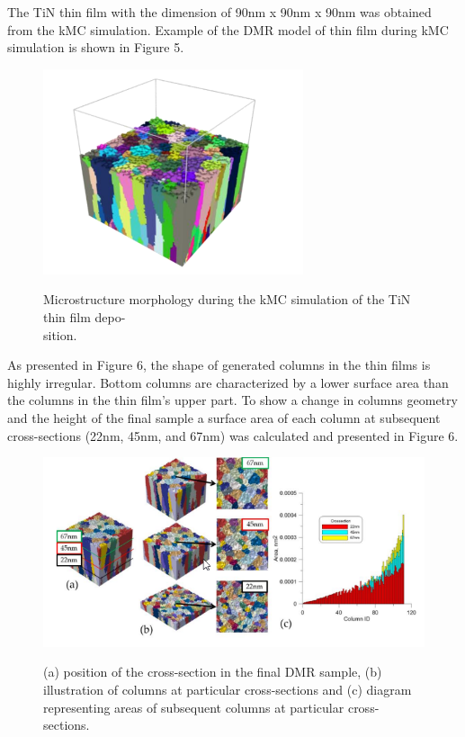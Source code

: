 \documentclass[journal,article,submit,pdftex,moreauthors]{Definitions/mdpi}
\begin{document}
The TiN thin film with the dimension of 90nm x 90nm x 90nm was obtained from the kMC simulation. Example of the DMR model of thin film during kMC simulation is shown in Figure 5.
 
\begin{figure}[H]
  \captionsetup{justification=centering}
  \centering
  \includegraphics{Definitions/picture5.png}
  \label{fig:obraz5}
    \caption{Microstructure morphology during the kMC simulation of the TiN thin film depo-\\sition.}
\end{figure}   
 
 
As presented in Figure 6, the shape of generated columns in the thin films is highly irregular. Bottom columns are characterized by a lower surface area than the columns in the thin film's upper part. To show a change in columns geometry and the height of the final sample a surface area of each column at subsequent cross-sections (22nm, 45nm, and 67nm) was calculated and presented in Figure 6.
 
\begin{figure}[H]
  \captionsetup{justification=centering}
  \centering
  \includegraphics{Definitions/picture6.png}
  \label{fig:obraz6}
    \caption{(a) position of the cross-section in the final DMR sample, (b) illustration of columns at particular cross-sections and (c) diagram representing areas of subsequent columns at particular cross-sections.}
\end{figure}   
 
\end{document}

